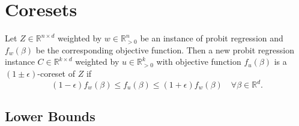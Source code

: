 \section{Coresets}

\begin{definition}
    Let $Z \in \mathbb{R}^{n \times d}$ weighted by
    $w \in \mathbb{R}^n_{>0}$ be an instance of probit regression and
    $f_w(\beta)$ be the corresponding objective function.
    Then a new probit regression instance
    $C \in \mathbb{R}^{k \times d}$ weighted
    by $u \in \mathbb{R}^k_{>0}$ with objective function
    $f_u(\beta)$ is a $(1 \pm \epsilon)$-coreset of $Z$ if
    \begin{equation*}
        \ (1 - \epsilon)f_w(\beta)
        \leq f_u(\beta) \leq (1 + \epsilon)f_w(\beta)
        \quad \forall \beta \in \mathbb{R}^d.
    \end{equation*}
\end{definition}

\subsection{Lower Bounds}